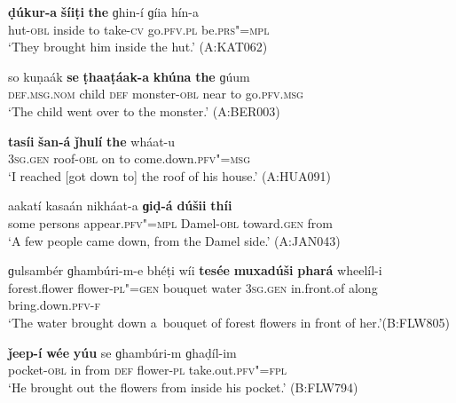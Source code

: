 \begin{exe}
\begin{exe}
\ex
\label{ex:7-93}
\gll \textbf{ḍúkur-a} \textbf{šíiṭi} \textbf{the} ɡhin-í ɡíia hín-a \\
hut-\textsc{obl} inside to take-\textsc{cv} go.\textsc{pfv.pl} be.\textsc{prs"=mpl} \\
\glt `They brought him inside the hut.' (A:KAT062)
\end{exe}
\begin{exe}
\ex
\label{ex:7-94}
\gll so kuṇaák \textbf{se} \textbf{ṭhaaṭáak-a} \textbf{khúna} \textbf{the} ɡúum \\
\textsc{def.msg.nom} child \textsc{def} monster-\textsc{obl} near to go.\textsc{pfv.msg} \\
\glt `The child went over to the monster.' (A:BER003)
\end{exe}
\begin{exe}
\ex
\label{ex:7-95}
\gll \textbf{tasíi} \textbf{šan-á} \textbf{ǰhulí} \textbf{the} wháat-u \\
\textsc{3sg.gen} roof-\textsc{obl} on to come.down.\textsc{pfv"=msg}  \\
\glt `I reached [got down to] the roof of his house.' (A:HUA091)
\end{exe}
\begin{exe}
\ex
\label{ex:7-96}
\gll aakatí kasaán nikháat-a \textbf{ɡiḍ-á} \textbf{dúšii} \textbf{\textmd{thíi}} \\
some persons appear.\textsc{pfv"=mpl} Damel-\textsc{obl} toward.\textsc{gen} from \\
\glt `A few people came down, from the Damel side.' (A:JAN043)
\end{exe}
\begin{exe}
\ex
\label{ex:7-97}
\gll ɡulsambér ɡhambúri-m-e bhéṭi wíi \textbf{tesée} \textbf{muxadúši} \textbf{phará} wheelíl-i\\
forest.flower flower-\textsc{pl"=gen} bouquet water \textsc{3sg.gen} in.front.of along bring.down.\textsc{pfv-f}\\
\glt `The water brought down a~bouquet of forest flowers in front of her.'\newline (B:FLW805)
\end{exe}
\begin{exe}
\ex
\label{ex:7-98}
\gll \label{bkm:Ref193771773}\textbf{ǰeep-í} \textbf{wée} \textbf{yúu} se ɡhambúri-m ɡhaḍíl-im \\
pocket-\textsc{obl} in from \textsc{def} flower-\textsc{pl}  take.out.\textsc{pfv"=fpl}\\
\glt `He brought out the flowers from inside his pocket.' (B:FLW794)
\end{exe}



\end{exe}
